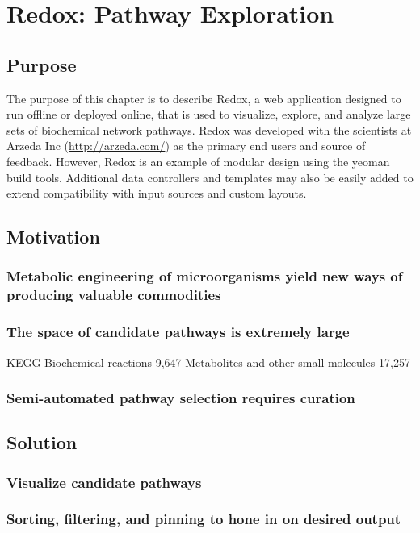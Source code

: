 \chapter{Redox: Pathway Exploration}

\section{Purpose}
The purpose of this chapter is to describe Redox, a web application designed to run offline or deployed online, that is used to visualize, explore, and analyze large sets of biochemical network pathways.
Redox was developed with the scientists at Arzeda Inc (\url{http://arzeda.com/}) as the primary end users and source of feedback.
However, Redox is an example of modular design using the yeoman build tools.
Additional data controllers and templates may also be easily added to extend compatibility with input sources and custom layouts.

\section{Motivation}
\subsection{Metabolic engineering of microorganisms yield new ways of producing valuable commodities}
\subsection{The space of candidate pathways is extremely large}
KEGG
Biochemical reactions 9,647
Metabolites and other small molecules 17,257
\subsection{Semi-automated pathway selection requires curation}


\section{Solution}
\subsection{Visualize candidate pathways}
\subsection{Sorting, filtering, and pinning to hone in on desired output}
